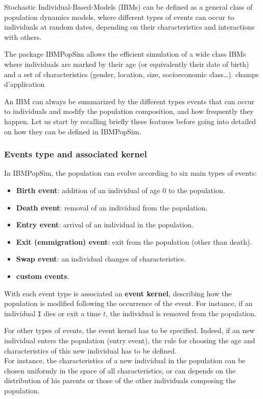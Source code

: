 Stochastic Individual-Based-Models (IBMs) can be defined as a general class of population dynamics models, where different types of events can occur to individuals at random dates, depending on their characteristics and interactions with others.

The package IBMPopSim allows the efficient simulation of a wide class IBMs where individuals are marked by their age (or equivalently their date of birth) and a set of characteristics (gender, location, size, socioeconomic class\ldots). { champs d'application}

An IBM can always be summarized by the different types events that can occur to individuals and modify the population composition, and how frequently they happen. Let us start by recalling briefly these features before going into detailed on how they can be defined in IBMPopSim.

\hypertarget{eventsTh}{%
\subsubsection{Events type and associated kernel}\label{eventsTh}}

In IBMPopSim, the population can evolve according to six main types of events:

\begin{itemize}
\tightlist
\item
  \textbf{Birth event}: addition of an individual of age 0 to the population.
\item
  \textbf{Death event}: removal of an individual from the population.
\item
  \textbf{Entry event}: arrival of an individual in the population.
\item
  \textbf{Exit (emmigration) event}: exit from the population (other than death).
\item
  \textbf{Swap event}: an individual changes of characteristics.
\item
  \textbf{custom events}.
\end{itemize}

With each event type is associated an \textbf{event kernel}, describing how the population is modified following the occurrence of the event. For instance, if an individual \texttt{I} dies or exit a time \(t\), the individual is removed from the population.

For other types of events, the event kernel has to be specified. Indeed, if an new individual enters the population (entry event), the rule for choosing the age and characteristics of this new individual has to be defined.\\
For instance, the characteristics of a new individual in the population can be chosen uniformly in the space of all characteristics, or can depends on the distribution of his parents or those of the other individuals composing the population.

